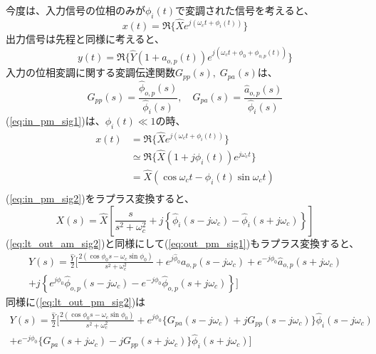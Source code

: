 \documentclass[book]{jlreq}
\begin{document}
今度は、入力信号の位相のみが$\phi_i(t)$で変調された信号を考えると、
%
\begin{equation}
    x(t) = \Re\{\hat{X} e^{j(\omega_ct + \phi_i(t))}\}
    \label{eq:in_pm_sig1}
\end{equation}
%
出力信号は先程と同様に考えると、
%
\begin{equation}
    y(t) = \Re\{\hat{Y}(1+a_{o, p}(t))e^{j(\omega_c t + \phi_0 + \phi_{o, p}(t))}\}
    \label{eq:out_pm_sig1}
\end{equation}
%
入力の位相変調に関する変調伝達関数$G_{pp}(s),\;G_{pa}(s)$は、
%
\begin{equation}
    G_{pp}(s) = \frac{\hat{\phi}_{o, p}(s)}{\hat{\phi}_i(s)}, \quad G_{pa}(s) = \frac{\hat{a}_{o, p}(s)}{\hat{\phi}_i(s)}
    \label{eq:pm_tf}
\end{equation}
%
(\ref{eq:in_pm_sig1})は、$\phi_i(t) \ll 1$の時、
%
\begin{equation}
    \begin{split}
        x(t) &= \Re\{\hat{X} e^{j(\omega_c t + \phi_i(t))}\} \\
        &\simeq \Re\{\hat{X}(1+j\phi_i(t)) e^{j\omega_c t}\} \\
        &= \hat{X} (\cos\omega_c t - \phi_i(t)\sin\omega_c t ) \\
        \label{eq:in_pm_sig2}
    \end{split}
\end{equation}
%
(\ref{eq:in_pm_sig2})をラプラス変換すると、
%
\begin{equation}
    X(s) = \hat{X}\left [\frac{s}{s^2+\omega_c^2}
        + j \left \{\hat{\phi}_i(s - j\omega_c) - \hat{\phi}_i(s+j\omega_c)\right \} \right ]
    \label{eq:lt_in_pm_sig2}
\end{equation}
%
(\ref{eq:lt_out_am_sig2})と同様にして(\ref{eq:out_pm_sig1})もラプラス変換すると、
%
\begin{multline}
    Y(s) = \frac{\hat{Y}}{2}\biggr [\frac{2(\cos\phi_0 s - \omega_c\sin\phi_0)}{s^2+\omega_c^2}
    + e^{j\hat{\phi}_0}a_{o, p}(s - j\omega_c) + e^{-j\phi_0}\hat{a}_{o, p}(s+j\omega_c) \\
    + j\left \{e^{j\phi_0}\hat{\phi}_{o,p}(s-j\omega_c) - e^{-j\phi_0}\hat{\phi}_{o,p}(s+j\omega_c) \right \} \biggl ]
    \label{eq:lt_out_pm_sig2}
\end{multline}
%
同様に(\ref{eq:lt_out_pm_sig2})は
%
\begin{multline}
    Y(s) = \frac{\hat{Y}}{2}\biggr [\frac{2(\cos\phi_0 s - \omega_c\sin\phi_0)}{s^2+\omega_c^2}
        + e^{j\phi_0}\{G_{pa}(s-j\omega_c)+j G_{pp}(s-j\omega_c)\}\hat{\phi}_i(s-j\omega_c) \\
        + e^{-j\phi_0}\{G_{pa}(s+j\omega_c)- j G_{pp}(s+j\omega_c)\}\hat{\phi}_i(s+j\omega_c)\biggl ]
    \label{eq:lt_out_pm_sig3}
\end{multline}
\end{document}
